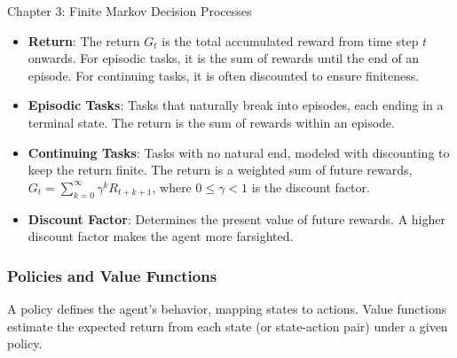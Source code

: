 \begin{notes}{Chapter 3: Finite Markov Decision Processes}
\begin{highlight}
        \begin{itemize}
            \item \textbf{Return}: The return \(G_t\) is the total accumulated reward from time step \(t\) onwards. For episodic tasks, it is the sum of rewards until the end of an episode. For continuing 
            tasks, it is often discounted to ensure finiteness.
            \item \textbf{Episodic Tasks}: Tasks that naturally break into episodes, each ending in a terminal state. The return is the sum of rewards within an episode.
            \item \textbf{Continuing Tasks}: Tasks with no natural end, modeled with discounting to keep the return finite. The return is a weighted sum of future rewards, \(G_t = \sum_{k=0}^{\infty} \gamma^k R_{t+k+1}\), where \(0 \leq \gamma < 1\) is the discount factor.
            \item \textbf{Discount Factor}: Determines the present value of future rewards. A higher discount factor makes the agent more farsighted.
        \end{itemize}
    
    \end{highlight}
    
    \subsubsection*{Policies and Value Functions}
    
    A policy defines the agent's behavior, mapping states to actions. Value functions estimate the expected return from each state (or state-action pair) under a given policy.
    
    \begin{highlight}
    

\end{highlight}
\end{notes}
